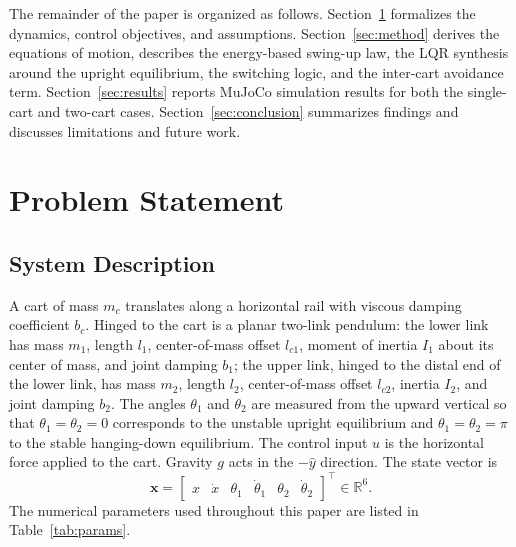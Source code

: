\documentclass[conference]{IEEEtran}
\begin{document}
The remainder of the paper is organized as follows. Section~\ref{sec:problem} formalizes the dynamics, control objectives, and assumptions. Section~\ref{sec:method} derives the equations of motion, describes the energy-based swing-up law, the LQR synthesis around the upright equilibrium, the switching logic, and the inter-cart avoidance term. Section~\ref{sec:results} reports MuJoCo \cite{todorov2012mujoco} simulation results for both the single-cart and two-cart cases. Section~\ref{sec:conclusion} summarizes findings and discusses limitations and future work.

\section{Problem Statement}\label{sec:problem}

\subsection{System Description}
A cart of mass $m_c$ translates along a horizontal rail with viscous damping coefficient $b_c$. Hinged to the cart is a planar two-link pendulum: the lower link has mass $m_1$, length $l_1$, center-of-mass offset $l_{c1}$, moment of inertia $I_1$ about its center of mass, and joint damping $b_1$; the upper link, hinged to the distal end of the lower link, has mass $m_2$, length $l_2$, center-of-mass offset $l_{c2}$, inertia $I_2$, and joint damping $b_2$. The angles $\theta_1$ and $\theta_2$ are measured from the upward vertical so that $\theta_1=\theta_2=0$ corresponds to the unstable upright equilibrium and $\theta_1=\theta_2=\pi$ to the stable hanging-down equilibrium. The control input $u$ is the horizontal force applied to the cart. Gravity $g$ acts in the $-\hat{y}$ direction. The state vector is
\begin{equation}
\mathbf{x} = \begin{bmatrix} x & \dot x & \theta_1 & \dot\theta_1 & \theta_2 & \dot\theta_2 \end{bmatrix}^{\!\top}\!\!\in \mathbb{R}^6.
\label{eq:state}
\end{equation}
The numerical parameters used throughout this paper are listed in Table~\ref{tab:params}.
\end{document}
